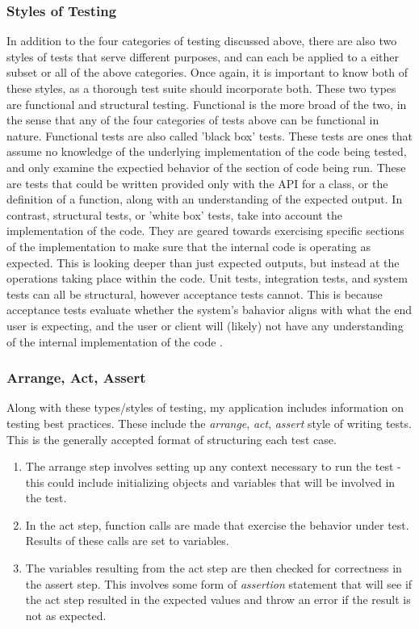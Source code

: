 \documentclass[10pt,twocolumn]{article}
\begin{document}
\subsubsection{Styles of Testing}

In addition to the four categories of testing discussed above, there are also two styles of tests that serve different 
purposes, and can each be applied to a either subset or all of the above categories. Once again, it is important to know 
both of these styles, as a thorough test suite should incorporate both. These two types are functional and structural 
testing. Functional is the more broad of the two, in the sense that any of the four categories of tests above can be 
functional in nature. Functional tests are also called 'black box' tests. These tests are ones that assume no knowledge 
of the underlying implementation of the code being tested, and only examine the expectied behavior of the section of 
code being run. These are tests that could be written provided only with the API for a class, or the definition of a 
function, along with an understanding of the expected output. In contrast, structural tests, or 'white box' tests, 
take into account the implementation of the code. They are geared towards exercising specific sections of the 
implementation to make sure that the internal code is operating as expected. This is looking deeper than just expected 
outputs, but instead at the operations taking place within the code. Unit tests, integration tests, and system tests 
can all be structural, however acceptance tests cannot. This is because acceptance tests evaluate whether the system's 
bahavior aligns with what the end user is expecting, and the user or client will (likely) not have any understanding of 
the internal implementation of the code \cite{Sawant2012Article}.

\subsubsection{Arrange, Act, Assert}

Along with these types/styles of testing, my application includes information on testing best practices. These include
the \textit{arrange}, \textit{act}, \textit{assert} style of writing tests. This is the generally accepted format of 
structuring each test case. 
\begin{enumerate}
    \item{The arrange step involves setting up any context necessary to run the test - this could 
    include initializing objects and variables that will be involved in the test.}
    \item{In the act step, function calls are made that exercise the behavior under test. Results of these calls are set
    to variables.}
    \item{The variables resulting from the act step are then checked for correctness in the assert step. This involves
    some form of \textit{assertion} statement that will see if the act step resulted in the expected values and throw
    an error if the result is not as expected.}
\end{enumerate}
\end{document}
